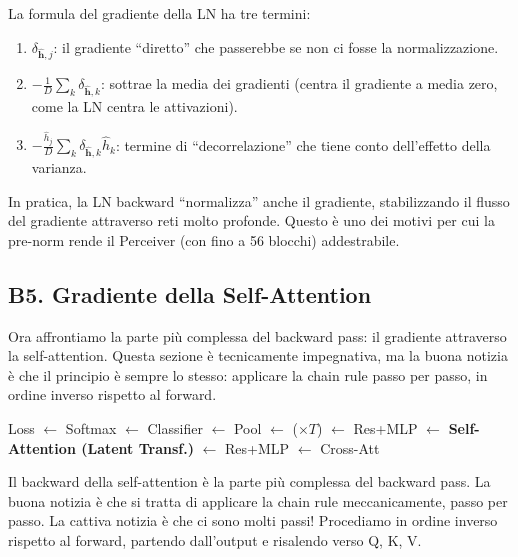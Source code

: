 \documentclass[12pt,a4paper]{article}
\begin{document}
\begin{notabox}
La formula del gradiente della LN ha tre termini:
\begin{enumerate}
    \item $\delta_{\hat{\mathbf{h}},j}$: il gradiente ``diretto'' che passerebbe se non ci fosse la normalizzazione.
    \item $-\frac{1}{D}\sum_k \delta_{\hat{\mathbf{h}},k}$: sottrae la media dei gradienti (centra il gradiente a media zero, come la LN centra le attivazioni).
    \item $-\frac{\hat{h}_j}{D}\sum_k \delta_{\hat{\mathbf{h}},k} \hat{h}_k$: termine di ``decorrelazione'' che tiene conto dell'effetto della varianza.
\end{enumerate}
In pratica, la LN backward ``normalizza'' anche il gradiente, stabilizzando il flusso del gradiente attraverso reti molto profonde. Questo \`e uno dei motivi per cui la pre-norm rende il Perceiver (con fino a 56 blocchi) addestrabile.
\end{notabox}


\subsection{B5. Gradiente della Self-Attention} \label{sec:grad_sa}

Ora affrontiamo la parte pi\`u complessa del backward pass: il gradiente attraverso la self-attention. Questa sezione \`e tecnicamente impegnativa, ma la buona notizia \`e che il principio \`e sempre lo stesso: applicare la chain rule passo per passo, in ordine inverso rispetto al forward.

\begin{pipelinebox}[title={\small Backward --- Passo corrente evidenziato}]
Loss $\leftarrow$ Softmax $\leftarrow$ Classifier $\leftarrow$ Pool $\leftarrow$ ($\times T$) $\leftarrow$ Res+MLP $\leftarrow$ \textbf{Self-Attention (Latent Transf.)} $\leftarrow$ Res+MLP $\leftarrow$ Cross-Att
\end{pipelinebox}

Il backward della self-attention \`e la parte pi\`u complessa del backward pass. La buona notizia \`e che si tratta di applicare la chain rule meccanicamente, passo per passo. La cattiva notizia \`e che ci sono molti passi! Procediamo in ordine inverso rispetto al forward, partendo dall'output e risalendo verso Q, K, V.
\end{document}
